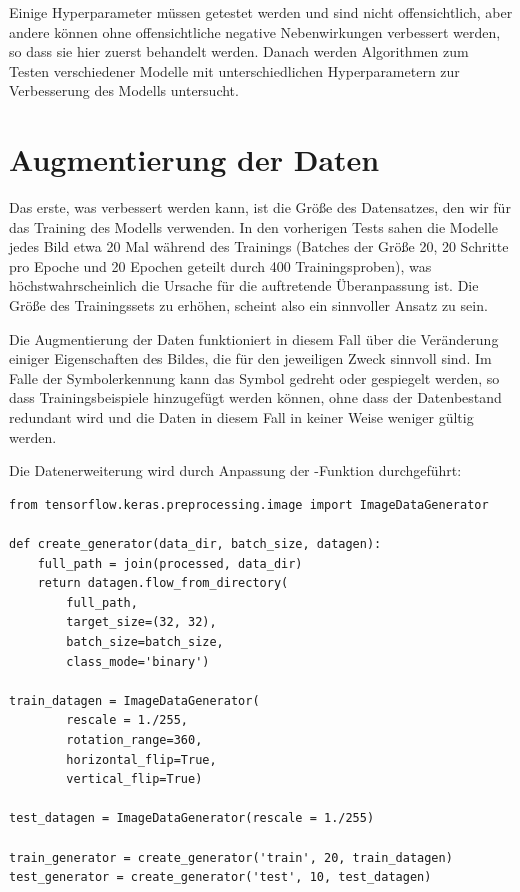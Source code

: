 Einige Hyperparameter müssen getestet werden und sind nicht offensichtlich, aber andere können ohne offensichtliche negative Nebenwirkungen verbessert werden, so dass sie hier zuerst behandelt werden. Danach werden Algorithmen zum Testen verschiedener Modelle mit unterschiedlichen Hyperparametern zur Verbesserung des Modells untersucht.

\section{Augmentierung der Daten} \label{ch:data_augmentation}

Das erste, was verbessert werden kann, ist die Größe des Datensatzes, den wir für das Training des Modells verwenden.
In den vorherigen Tests sahen die Modelle jedes Bild etwa 20 Mal während des Trainings (Batches der Größe 20, 20 Schritte pro Epoche und 20 Epochen geteilt durch 400 Trainingsproben), was höchstwahrscheinlich die Ursache für die auftretende Überanpassung ist.
Die Größe des Trainingssets zu erhöhen, scheint also ein sinnvoller Ansatz zu sein.

Die Augmentierung der Daten funktioniert in diesem Fall über die Veränderung einiger Eigenschaften des Bildes, die für den jeweiligen Zweck sinnvoll sind.
Im Falle der Symbolerkennung kann das Symbol gedreht oder gespiegelt werden, so dass Trainingsbeispiele hinzugefügt werden können, ohne dass der Datenbestand redundant wird und die Daten in diesem Fall in keiner Weise weniger gültig werden.

Die Datenerweiterung wird durch Anpassung der -Funktion durchgeführt:

\begin{lstlisting}[caption={Augmentierung der Trainingsdaten.}]
from tensorflow.keras.preprocessing.image import ImageDataGenerator

def create_generator(data_dir, batch_size, datagen):
    full_path = join(processed, data_dir)
    return datagen.flow_from_directory(
        full_path,
        target_size=(32, 32),
        batch_size=batch_size,
        class_mode='binary')

train_datagen = ImageDataGenerator(
        rescale = 1./255,
        rotation_range=360,
        horizontal_flip=True,
        vertical_flip=True)

test_datagen = ImageDataGenerator(rescale = 1./255)

train_generator = create_generator('train', 20, train_datagen)
test_generator = create_generator('test', 10, test_datagen)
\end{lstlisting}

